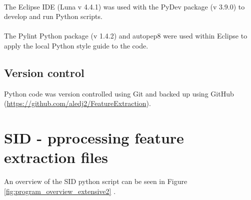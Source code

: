 \paragraph*{}
The Eclipse \ac{IDE} (Luna v 4.4.1) \cite{the_eclipse_foundation_eclipse_????} was used with the PyDev package (v 3.9.0) \cite{pydev_python_????} to develop and run Python scripts.
\paragraph*{}
The Pylint Python package (v 1.4.2) \cite{pylint_code_????} and autopep8 were used within Eclipse to apply the local Python style guide to the code.

\subsection{Version control}
Python code was version controlled using Git and backed up using GitHub (\url{https://github.com/aledj2/FeatureExtraction}).


\section{SID - pprocessing feature extraction files}
An overview of the SID python script can be seen in Figure \ref{fig:program_overview_extensive2} .

